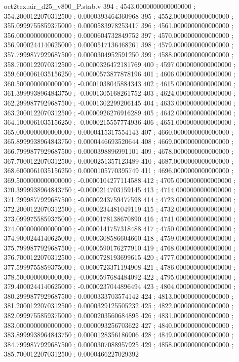 \begin{filecontents}[overwrite]{oct2tex.air_d25_v800_P.stab.v}
394 ; 4543.0000000000000000 ; 354.2000122070312500 ; 0.0000393464360968
395 ; 4552.0000000000000000 ; 355.0999755859375000 ; 0.0000583978253417
396 ; 4561.0000000000000000 ; 356.0000000000000000 ; 0.0000604732849752
397 ; 4570.0000000000000000 ; 356.9000244140625000 ; 0.0000517136468261
398 ; 4579.0000000000000000 ; 357.7999877929687500 ; 0.0000304952591250
399 ; 4588.0000000000000000 ; 358.7000122070312500 ; -0.0000326472181769
400 ; 4597.0000000000000000 ; 359.6000061035156250 ; -0.0000573877878196
401 ; 4606.0000000000000000 ; 360.5000000000000000 ; -0.0001038045884343
402 ; 4615.0000000000000000 ; 361.3999938964843750 ; -0.0001305168261752
403 ; 4624.0000000000000000 ; 362.2999877929687500 ; -0.0001302299206145
404 ; 4633.0000000000000000 ; 363.2000122070312500 ; -0.0000926276916289
405 ; 4642.0000000000000000 ; 364.1000061035156250 ; -0.0000215557774936
406 ; 4651.0000000000000000 ; 365.0000000000000000 ; 0.0000415317554143
407 ; 4660.0000000000000000 ; 365.8999938964843750 ; 0.0000446693520644
408 ; 4669.0000000000000000 ; 366.7999877929687500 ; 0.0000398896991101
409 ; 4678.0000000000000000 ; 367.7000122070312500 ; 0.0000251357123489
410 ; 4687.0000000000000000 ; 368.6000061035156250 ; 0.0000105770395749
411 ; 4696.0000000000000000 ; 369.5000000000000000 ; -0.0000104277114588
412 ; 4705.0000000000000000 ; 370.3999938964843750 ; -0.0000214703159145
413 ; 4714.0000000000000000 ; 371.2999877929687500 ; -0.0000243759477598
414 ; 4723.0000000000000000 ; 372.2000122070312500 ; -0.0000234481049119
415 ; 4732.0000000000000000 ; 373.0999755859375000 ; -0.0000178138670890
416 ; 4741.0000000000000000 ; 374.0000000000000000 ; -0.0000141757318488
417 ; 4750.0000000000000000 ; 374.9000244140625000 ; -0.0000308586604660
418 ; 4759.0000000000000000 ; 375.7999877929687500 ; -0.0000590176277910
419 ; 4768.0000000000000000 ; 376.7000122070312500 ; -0.0000728193699615
420 ; 4777.0000000000000000 ; 377.5999755859375000 ; -0.0000723371194908
421 ; 4786.0000000000000000 ; 378.5000000000000000 ; -0.0000597684484092
422 ; 4795.0000000000000000 ; 379.4000244140625000 ; -0.0000237044896494
423 ; 4804.0000000000000000 ; 380.2999877929687500 ; 0.0000333703574142
424 ; 4813.0000000000000000 ; 381.2000122070312500 ; 0.0000329125505232
425 ; 4822.0000000000000000 ; 382.0999755859375000 ; 0.0000203560684895
426 ; 4831.0000000000000000 ; 383.0000000000000000 ; 0.0000093256703622
427 ; 4840.0000000000000000 ; 383.8999938964843750 ; 0.0000128356186906
428 ; 4849.0000000000000000 ; 384.7999877929687500 ; 0.0000307088957925
429 ; 4858.0000000000000000 ; 385.7000122070312500 ; 0.0000466227029392

\end{filecontents}

